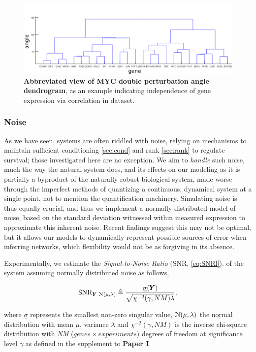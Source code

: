 \begin{figure}[H]
\centering
\includegraphics[width=1\linewidth]{4/MYC_Y_weightedDouble_dendrogram.png}
\caption{\textbf{Abbreviated view of MYC double perturbation angle dendrogram}, as an example indicating independence of gene expression via correlation in dataset.}
\label{fig:dend}
\end{figure}

\pagebreak

\subsubsection{Noise}
\label{sec:snr}
As we have seen, systems are often riddled with noise, relying on mechanisms to maintain sufficient conditioning \cref{sec:cond} and rank \cref{sec:rank} to regulate survival; those investigated here are no exception. We aim to \emph{handle} such noise, much the way the natural system does, and its effects on our modeling as it is partially a byproduct of the naturally robust biological system, made worse through the imperfect methods of quantizing a continuous, dynamical system at a single point, not to mention the quantification machinery. Simulating noise is thus equally crucial, and thus we implement a normally distributed model of noise, based on the standard deviation witnessed within measured expression to approximate this inherent noise. Recent findings suggest this may not be optimal, but it allows our models to dynamically represent possible sources of error when inferring networks, which flexibility would not be as forgiving in its absence.

Experimentally, we estimate the \emph{Signal-to-Noise Ratio} (SNR, \cref{eq:SNRl}). of the system assuming normally distributed noise as follows,

\begin{equation}
	\operatorname{SNR}_{{\pmb{Y}}\, \operatorname{\mathcal{N}(\mu,\lambda)}} \triangleq \frac{\underline{\sigma}({\pmb{Y}})}{\sqrt{\chi^{-2}(\gamma,NM)\lambda}},
  \label{eq:SNRl}
\end{equation}

where $\underline{\sigma}$ represents the smallest non-zero singular value, $\operatorname{\mathcal{N}(\mu,\lambda)}$ the normal distribution with mean $\mu$, variance $\lambda$ and $\chi^{-2}(\gamma,NM)$ is the inverse chi-square distribution with \emph{NM} ($genes \times experiments$) degrees of freedom at significance level $\gamma$ as defined in the supplement to \textbf{Paper I}.

